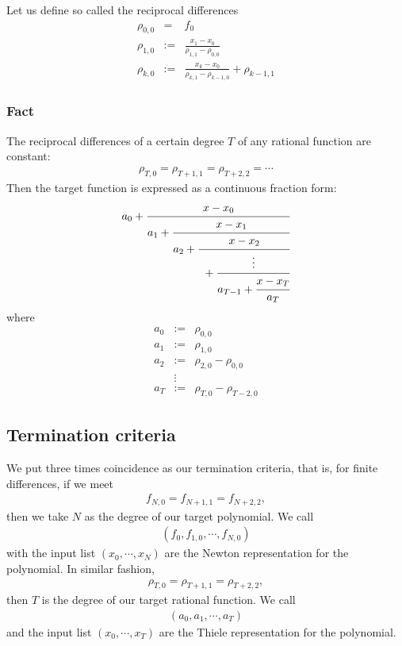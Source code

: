 \documentclass[11pt]{book}
\begin{document}
Let us define so called the reciprocal differences
\begin{eqnarray}
\rho_{0,0} &=& f_0 \\
\rho_{1,0} &:=& \frac{x_1 - x_0}{\rho_{1,1} - \rho_{0,0}} \\
\rho_{k,0} &:=& \frac{x_k - x_0}{\rho_{k,1} - \rho_{k-1,0}} + \rho_{k-1,1}
\end{eqnarray}

\subsubsection{Fact}
The reciprocal differences of a certain degree $T$ of any rational function are constant:
\begin{eqnarray}
\rho_{T,0} = \rho_{T+1,1} = \rho_{T+2,2} = \cdots
\end{eqnarray}
Then the target function is expressed as a continuous fraction form:
\begin{eqnarray}
a_0 + \cfrac{x-x_0}{a_1 + \cfrac{x-x_1}{a_2 + \cfrac{x-x_2}{\text{ } + \cfrac{\vdots}{a_{T-1} + \cfrac{x - x_T}{a_T}}}}}
\end{eqnarray}
where
\begin{eqnarray}
a_0 &:=& \rho_{0,0} \\
a_1 &:=& \rho_{1,0} \\
a_2 &:=& \rho_{2,0} - \rho_{0,0}\\
\nonumber
&\vdots&\\
a_T &:=& \rho_{T,0} - \rho_{T-2,0}
\end{eqnarray}

\subsection{Termination criteria}
We put three times coincidence as our termination criteria, that is, for finite differences, if we meet
\begin{eqnarray}
f_{N,0} = f_{N+1,1} = f_{N+2,2},
\end{eqnarray}
then we take $N$ as the degree of our target polynomial.
We call
\begin{eqnarray}
(f_0, f_{1,0}, \cdots, f_{N,0})
\end{eqnarray}
with the input list $(x_0, \cdots, x_N)$ are the Newton representation for the polynomial.
In similar fashion,
\begin{eqnarray}
\rho_{T,0} = \rho_{T+1,1} = \rho_{T+2,2},
\end{eqnarray}
then $T$ is the degree of our target rational function.
We call
\begin{eqnarray}
(a_0, a_1, \cdots, a_T)%
\end{eqnarray}
and the input list $(x_0, \cdots, x_T)$ are the Thiele representation for the polynomial.
\end{document}

